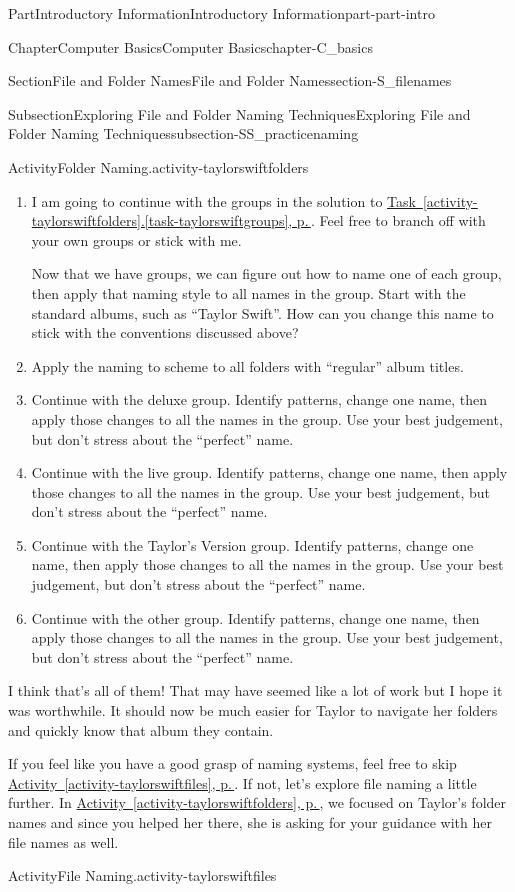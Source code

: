 \documentclass[twoside,10pt,]{book}
\newcommand{\xreffont}{\relax}
\begin{document}
\begin{partptx}{Part}{Introductory Information}{}{Introductory Information}{}{}{part-part-intro}
\begin{chapterptx}{Chapter}{Computer Basics}{}{Computer Basics}{}{}{chapter-C_basics}
\begin{sectionptx}{Section}{File and Folder Names}{}{File and Folder Names}{}{}{section-S_filenames}
\begin{subsectionptx}{Subsection}{Exploring File and Folder Naming Techniques}{}{Exploring File and Folder Naming Techniques}{}{}{subsection-SS_practicenaming}
\begin{activity}{Activity}{Folder Naming.}{activity-taylorswiftfolders}
\begin{enumerate}[font=\bfseries,label=(\alph*),ref=\alph*]
\item{}I am going to continue with the groups in the solution to \hyperref[task-taylorswiftgroups]{Task~{\xreffont\ref{activity-taylorswiftfolders}}.{\xreffont\ref{task-taylorswiftgroups}}, p.\,\pageref{task-taylorswiftgroups}}. Feel free to branch off with your own groups or stick with me.%
\par
Now that we have groups, we can figure out how to name one of each group, then apply that naming style to all names in the group. Start with the standard albums, such as ``Taylor Swift''. How can you change this name to stick with the conventions discussed above?%
\item{}Apply the naming to scheme to all folders with ``regular'' album titles.%
\item{}Continue with the deluxe group. Identify patterns, change one name, then apply those changes to all the names in the group. Use your best judgement, but don't stress about the ``perfect'' name.%
\item{}Continue with the live group. Identify patterns, change one name, then apply those changes to all the names in the group. Use your best judgement, but don't stress about the ``perfect'' name.%
\item{}Continue with the Taylor's Version group. Identify patterns, change one name, then apply those changes to all the names in the group. Use your best judgement, but don't stress about the ``perfect'' name.%
\item{}Continue with the other group. Identify patterns, change one name, then apply those changes to all the names in the group. Use your best judgement, but don't stress about the ``perfect'' name.%
\end{enumerate}%
I think that's all of them! That may have seemed like a lot of work but I hope it was worthwhile. It should now be much easier for Taylor to navigate her folders and quickly know that album they contain.%
\end{activity}%
If you feel like you have a good grasp of naming systems, feel free to skip \hyperref[activity-taylorswiftfiles]{Activity~{\xreffont\ref{activity-taylorswiftfiles}}, p.\,\pageref{activity-taylorswiftfiles}}. If not, let's explore file naming a little further. In \hyperref[activity-taylorswiftfolders]{Activity~{\xreffont\ref{activity-taylorswiftfolders}}, p.\,\pageref{activity-taylorswiftfolders}}, we focused on Taylor's folder names and since you helped her there, she is asking for your guidance with her file names as well.%
\begin{activity}{Activity}{File Naming.}{activity-taylorswiftfiles}%

\end{activity}
\end{subsectionptx}
\end{sectionptx}
\end{chapterptx}
\end{partptx}
\end{document}
